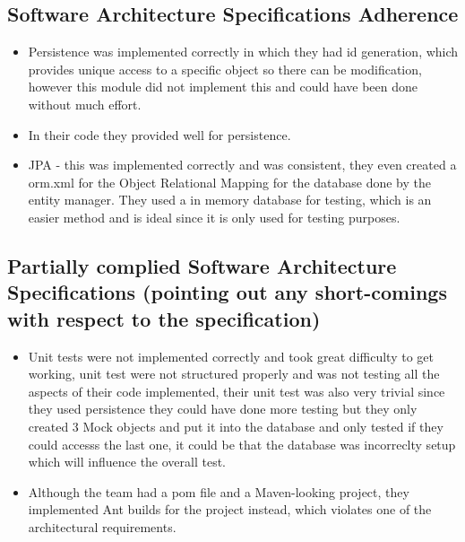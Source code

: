 \documentclass{article}
\begin{document}
	\subsection{Software Architecture Specifications Adherence}
	\begin{itemize}

	\item Persistence was implemented correctly in which they had id generation, which provides unique access to a specific object so there can be modification, however this module did not implement this and could have been done without much effort. 

			\item In their code they provided well for persistence.
		\item JPA - this was implemented correctly and was consistent, they even created a orm.xml for the Object Relational Mapping for the database done by the entity manager. They used a in memory database for testing, which is an easier method and is ideal since it is only used for testing purposes.
	\item@TODO

	\end{itemize}

	\subsection{Partially complied Software Architecture Specifications (pointing out any short-comings with respect to the specification)}

	\begin{itemize}

		\item Unit tests were not implemented correctly and took great difficulty to get working, unit test were not structured properly and was not testing all the aspects of their code implemented, their unit test was also very trivial since they used persistence they could have done more testing but they only created 3 Mock objects and put it into the database and only tested if they could accesss the last one, it could be that the database was incorreclty setup which will influence the overall test.
		\item Although the team had a pom file and a Maven-looking project, they implemented Ant builds for the project instead, which violates one of the architectural requirements.
		\item@TODO
	\end{itemize}
\end{document}
